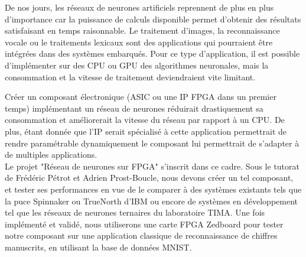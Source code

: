 De nos jours, les réseaux de neurones artificiels reprennent de plus en plus d'importance car la puissance de calculs disponible permet d'obtenir des résultats satisfaisant en temps raisonnable.
Le traitement d'images, la reconnaissance vocale ou le traitements lexicaux sont
des applications qui pourraient être intégrées dans des systèmes embarqués. Pour ce type d'application, il est possible 
d'implémenter sur des CPU ou GPU des algorithmes neuronales, mais la consommation et la vitesse de traitement deviendraient vite limitant.

Créer un composant électronique (ASIC ou une IP FPGA dans un premier temps) implémentant un réseau de neurones réduirait drastiquement sa consommation
et améliorerait la vitesse du réseau par rapport à un CPU. De plus, étant donnée que l'IP serait spécialisé à cette application permettrait de rendre paramétrable dynamiquement le
composant lui permettrait de s'adapter à de multiples applications.\\

Le projet "Réseau de neurones sur FPGA" s'inscrit dans ce cadre. Sous le tutorat
de Frédéric Pétrot et Adrien Prost-Boucle, nous devons créer un tel composant,
et tester ses performances en vue de le comparer à des systèmes existants tels
que la puce Spinnaker ou TrueNorth d'IBM ou encore de systèmes en développement
tel que les réseaux de neurones ternaires du laboratoire TIMA. Une fois
implémenté et validé, nous utiliserons une carte FPGA Zedboard pour tester notre
composant sur une application classique de reconnaissance de chiffres manuscrits,
en utilisant la base de données MNIST.
